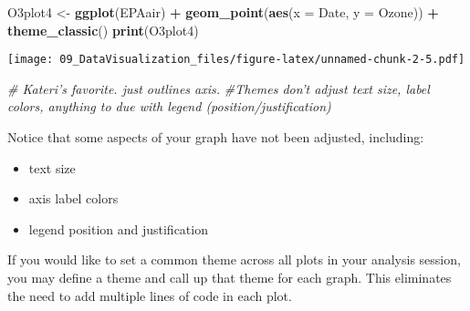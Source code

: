 \documentclass[]{article}
\newenvironment{Shaded}{\begin{snugshade}}{\end{snugshade}}
\newcommand{\KeywordTok}[1]{\textcolor[rgb]{0.13,0.29,0.53}{\textbf{#1}}}
\newcommand{\DataTypeTok}[1]{\textcolor[rgb]{0.13,0.29,0.53}{#1}}
\newcommand{\StringTok}[1]{\textcolor[rgb]{0.31,0.60,0.02}{#1}}
\newcommand{\CommentTok}[1]{\textcolor[rgb]{0.56,0.35,0.01}{\textit{#1}}}
\newcommand{\OperatorTok}[1]{\textcolor[rgb]{0.81,0.36,0.00}{\textbf{#1}}}
\newcommand{\NormalTok}[1]{#1}
\providecommand{\tightlist}{%
  \setlength{\itemsep}{0pt}\setlength{\parskip}{0pt}}
\begin{document}
\begin{Shaded}
\begin{Highlighting}[]
\NormalTok{O3plot4 <-}\StringTok{ }\KeywordTok{ggplot}\NormalTok{(EPAair) }\OperatorTok{+}
\StringTok{  }\KeywordTok{geom_point}\NormalTok{(}\KeywordTok{aes}\NormalTok{(}\DataTypeTok{x =}\NormalTok{ Date, }\DataTypeTok{y =}\NormalTok{ Ozone)) }\OperatorTok{+}
\StringTok{  }\KeywordTok{theme_classic}\NormalTok{()}
\KeywordTok{print}\NormalTok{(O3plot4)}
\end{Highlighting}
\end{Shaded}

\texttt{[image: 09\_DataVisualization\_files/figure-latex/unnamed-chunk-2-5.pdf]}

\begin{Shaded}
\begin{Highlighting}[]
\CommentTok{# Kateri's favorite. just outlines axis.}
\CommentTok{#Themes don't adjust text size, label colors, anything to due with legend (position/justification)}
\end{Highlighting}
\end{Shaded}

Notice that some aspects of your graph have not been adjusted,
including:

\begin{itemize}
\tightlist
\item
  text size
\item
  axis label colors
\item
  legend position and justification
\end{itemize}

If you would like to set a common theme across all plots in your
analysis session, you may define a theme and call up that theme for each
graph. This eliminates the need to add multiple lines of code in each
plot.
\end{document}
